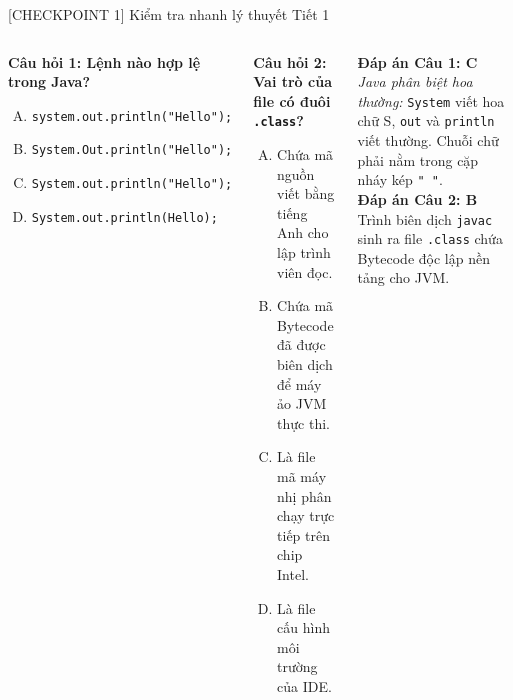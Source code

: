 \documentclass[aspectratio=169, 10pt]{beamer}
\begin{document}
\begin{frame}{[CHECKPOINT 1] Kiểm tra nhanh lý thuyết Tiết 1}
  \begin{columns}
    \begin{exampleblock}{\textbf{Câu hỏi 1: Lệnh nào hợp lệ trong Java?}}
      \begin{enumerate}[A.]
        \item \texttt{system.out.println("Hello");}
        \item \texttt{System.Out.println("Hello");}
        \item \texttt{System.out.println("Hello");}
        \item \texttt{System.out.println(Hello);}
      \end{enumerate}
    \end{exampleblock}

    \begin{alertblock}{\textbf{Câu hỏi 2: Vai trò của file có đuôi \texttt{.class}?}}
      \begin{enumerate}[A.]
        \item Chứa mã nguồn viết bằng tiếng Anh cho lập trình viên đọc.
        \item Chứa mã Bytecode đã được biên dịch để máy ảo JVM thực thi.
        \item Là file mã máy nhị phân chạy trực tiếp trên chip Intel.
        \item Là file cấu hình môi trường của IDE.
      \end{enumerate}
    \end{alertblock}

    \begin{tcolorbox}[colback=white,colframe=UniGreen,title=\textbf{Giải thích đáp án}]
      \small
      \textbf{Đáp án Câu 1: C}\\
      \textit{Java phân biệt hoa thường:} \texttt{System} viết hoa chữ S, \texttt{out} và \texttt{println} viết thường. Chuỗi chữ phải nằm trong cặp nháy kép \texttt{" "}.\\[2mm]
      \textbf{Đáp án Câu 2: B}\\
      Trình biên dịch \texttt{javac} sinh ra file \texttt{.class} chứa Bytecode độc lập nền tảng cho JVM.
    \end{tcolorbox}
  \end{columns}
\end{frame}
\end{document}

